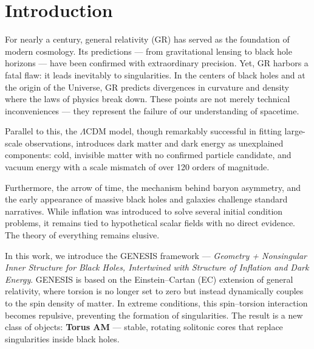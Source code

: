 \documentclass{article}
\begin{document}
   


\clearpage



\tableofcontents
\thispagestyle{empty}
\clearpage









\section{Introduction}

For nearly a century, general relativity (GR) has served as the foundation of modern cosmology. Its predictions — from gravitational lensing to black hole horizons — have been confirmed with extraordinary precision. Yet, GR harbors a fatal flaw: it leads inevitably to singularities. In the centers of black holes and at the origin of the Universe, GR predicts divergences in curvature and density where the laws of physics break down. These points are not merely technical inconveniences — they represent the failure of our understanding of spacetime.

Parallel to this, the $\Lambda$CDM model, though remarkably successful in fitting large-scale observations, introduces dark matter and dark energy as unexplained components: cold, invisible matter with no confirmed particle candidate, and vacuum energy with a scale mismatch of over 120 orders of magnitude.

Furthermore, the arrow of time, the mechanism behind baryon asymmetry, and the early appearance of massive black holes and galaxies challenge standard narratives. While inflation was introduced to solve several initial condition problems, it remains tied to hypothetical scalar fields with no direct evidence. The theory of everything remains elusive.

\vspace{1ex}

In this work, we introduce the GENESIS framework — \emph{Geometry + Nonsingular Inner Structure for Black Holes, Intertwined with Structure of Inflation and Dark Energy}. GENESIS is based on the Einstein–Cartan (EC) extension of general relativity, where torsion is no longer set to zero but instead dynamically couples to the spin density of matter. In extreme conditions, this spin–torsion interaction becomes repulsive, preventing the formation of singularities. The result is a new class of objects: \textbf{Torus AM} — stable, rotating solitonic cores that replace singularities inside black holes.
\end{document}
